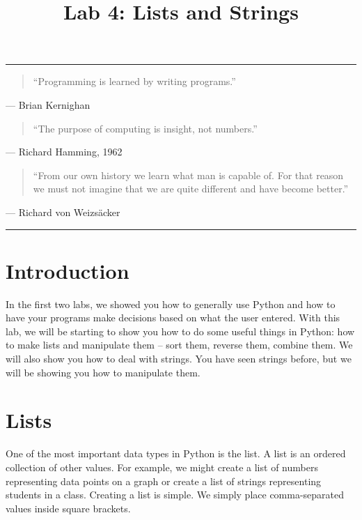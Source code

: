 \documentclass[11pt]{cselabheader}
\title{Lab 4: Lists and Strings}
\begin{document}
\maketitle

\hrule

\begin{quotation}
``Programming is learned by writing programs.''
\end{quotation}
\begin{flushright}
--- Brian Kernighan
\end{flushright}

\begin{quotation}
``The purpose of computing is insight, not numbers.''
\end{quotation}
\begin{flushright}
--- Richard Hamming, 1962
\end{flushright}

\begin{quotation}
  ``From our own history we learn what man is capable of. For that reason we
  must not imagine that we are quite different and have become better.''
\end{quotation}
\begin{flushright}
	--- Richard von Weizs\"{a}cker
\end{flushright}
\hrule

\section{Introduction}
In the first two labs, we showed you how to generally use Python and how to
have your programs make decisions based on what the user entered. With this
lab, we will be starting to show you how to do some useful things in Python:
how to make lists and manipulate them -- sort them, reverse them, combine them.
We will also show you how to deal with strings. You have
seen strings before, but we will be showing you how to manipulate them.

\pagebreak
\section{Lists}
One of the most important data types in Python is the list. A list is an ordered
collection of other values. For example, we might create a list of numbers
representing data points on a graph or create a list of strings representing
students in a class. Creating a list is simple. We simply place comma-separated
values inside square brackets.
\end{document}
